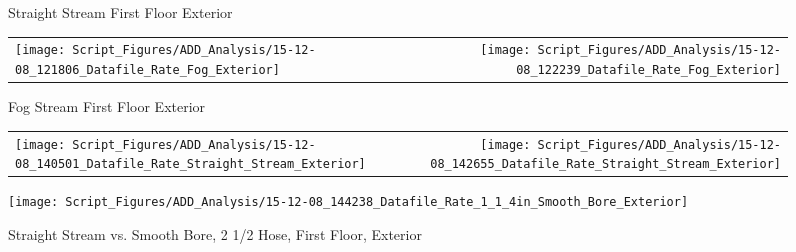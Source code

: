 \documentclass[12pt,oneside]{book}
\begin{document}
\begin{figure}[ht]
\centering
{}
\caption{Straight Stream First Floor Exterior}
\label{fig:Straight Stream First Floor Exterior}
\end{figure}

\clearpage

\begin{figure}[ht]
\begin{tabular*}{\textwidth}{lr}
\texttt{[image: Script\_Figures/ADD\_Analysis/15-12-08\_121806\_Datafile\_Rate\_Fog\_Exterior]} &
\texttt{[image: Script\_Figures/ADD\_Analysis/15-12-08\_122239\_Datafile\_Rate\_Fog\_Exterior]} \\
\end{tabular*}
\caption{Fog Stream First Floor Exterior}
\label{fig:Fog Stream First Floor Exterior}
\end{figure}

\clearpage

\begin{figure}[ht]
\begin{tabular*}{\textwidth}{lr}
\texttt{[image: Script\_Figures/ADD\_Analysis/15-12-08\_140501\_Datafile\_Rate\_Straight\_Stream\_Exterior]} &
\texttt{[image: Script\_Figures/ADD\_Analysis/15-12-08\_142655\_Datafile\_Rate\_Straight\_Stream\_Exterior]} \\
\end{tabular*}
\centering
\texttt{[image: Script\_Figures/ADD\_Analysis/15-12-08\_144238\_Datafile\_Rate\_1\_1\_4in\_Smooth\_Bore\_Exterior]}
\caption{Straight Stream vs. Smooth Bore, 2 1/2 Hose, First Floor, Exterior}
\label{fig:Straight Stream vs. Smooth Bore, 2 1/2 Hose, First Floor Exterior}
\end{figure}
\end{document}
